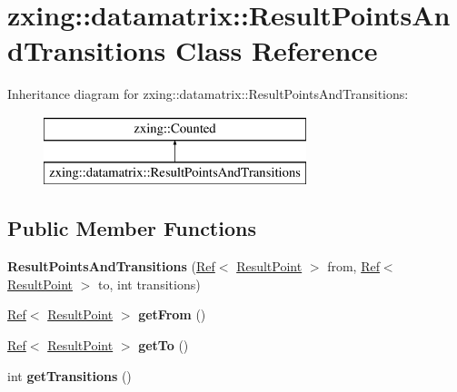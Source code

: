 \hypertarget{classzxing_1_1datamatrix_1_1_result_points_and_transitions}{}\section{zxing\+:\+:datamatrix\+:\+:Result\+Points\+And\+Transitions Class Reference}
\label{classzxing_1_1datamatrix_1_1_result_points_and_transitions}
Inheritance diagram for zxing\+:\+:datamatrix\+:\+:Result\+Points\+And\+Transitions\+:\begin{figure}[H]
\begin{center}
\leavevmode
\includegraphics[height=2.000000cm]{classzxing_1_1datamatrix_1_1_result_points_and_transitions}
\end{center}
\end{figure}
\subsection*{Public Member Functions}
\begin{DoxyCompactItemize}
\item 
\mbox{\label{classzxing_1_1datamatrix_1_1_result_points_and_transitions_a4dab1c05b3f5474451a448dddd10c681}} 
{\bfseries Result\+Points\+And\+Transitions} (\mbox{\hyperlink{classzxing_1_1_ref}{Ref}}$<$ \mbox{\hyperlink{classzxing_1_1_result_point}{Result\+Point}} $>$ from, \mbox{\hyperlink{classzxing_1_1_ref}{Ref}}$<$ \mbox{\hyperlink{classzxing_1_1_result_point}{Result\+Point}} $>$ to, int transitions)
\item 
\mbox{\label{classzxing_1_1datamatrix_1_1_result_points_and_transitions_ad477a81d2619626ab1d61c4f4476770e}} 
\mbox{\hyperlink{classzxing_1_1_ref}{Ref}}$<$ \mbox{\hyperlink{classzxing_1_1_result_point}{Result\+Point}} $>$ {\bfseries get\+From} ()
\item 
\mbox{\label{classzxing_1_1datamatrix_1_1_result_points_and_transitions_ae8e11441a5dc5f50c157e275268b3c27}} 
\mbox{\hyperlink{classzxing_1_1_ref}{Ref}}$<$ \mbox{\hyperlink{classzxing_1_1_result_point}{Result\+Point}} $>$ {\bfseries get\+To} ()
\item 
\mbox{\label{classzxing_1_1datamatrix_1_1_result_points_and_transitions_aa025dc3af87a746369714e66db8b570a}} 
int {\bfseries get\+Transitions} ()
\end{DoxyCompactItemize}


